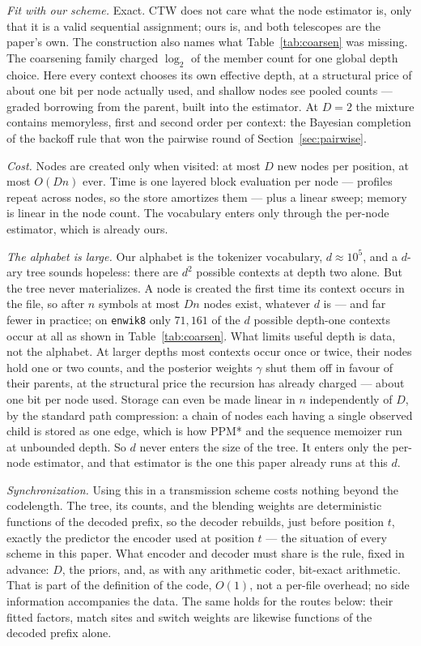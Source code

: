 \documentclass[11pt]{article}
\begin{document}
\emph{Fit with our scheme.}  Exact.  CTW does not care what the node
estimator is, only that it is a valid sequential assignment; ours is,
and both telescopes are the paper's own.  The construction also names
what Table~\ref{tab:coarsen} was missing.  The coarsening family
charged $\log_2$ of the member count for one global depth choice.
Here every context chooses its own effective depth, at a structural
price of about one bit per node actually used, and shallow nodes see
pooled counts --- graded borrowing from the parent, built into the
estimator.  At $D=2$ the mixture contains memoryless, first and
second order per context: the Bayesian completion of the backoff rule
that won the pairwise round of Section~\ref{sec:pairwise}.

\emph{Cost.}  Nodes are created only when visited: at most $D$ new
nodes per position, at most $O(Dn)$ ever.  Time is one layered block
evaluation per node --- profiles repeat across nodes, so the store
amortizes them --- plus a linear sweep; memory is linear in the node
count.  The vocabulary enters only through the per-node estimator,
which is already ours.

\emph{The alphabet is large.}  Our alphabet is the tokenizer
vocabulary, $d \approx 10^5$, and a $d$-ary tree sounds hopeless:
there are $d^2$ possible contexts at depth two alone.  But the tree
never materializes.  A node is created the first time its context
occurs in the file, so after $n$ symbols at most $Dn$ nodes exist,
whatever $d$ is --- and far fewer in practice; on \texttt{enwik8}
only $71{,}161$ of the $d$ possible depth-one contexts occur at all
as shown in Table~\ref{tab:coarsen}.  What limits useful depth is data, not
the alphabet.  At larger depths most contexts occur once or twice,
their nodes hold one or two counts, and the posterior weights
$\gamma$ shut them off in favour of their parents, at the structural
price the recursion has already charged --- about one bit per node
used.  Storage can even be made linear in $n$ independently of $D$,
by the standard path compression: a chain of nodes each having a
single observed child is stored as one edge, which is how PPM* and
the sequence memoizer run at unbounded depth.  So $d$ never enters
the size of the tree.  It enters only the per-node estimator, and
that estimator is the one this paper already runs at this $d$.

\emph{Synchronization.}  Using this in a transmission scheme costs
nothing beyond the codelength.  The tree, its counts, and the
blending weights are deterministic functions of the decoded prefix,
so the decoder rebuilds, just before position $t$, exactly the
predictor the encoder used at position $t$ --- the situation of every
scheme in this paper.  What encoder and decoder must share is the
rule, fixed in advance: $D$, the priors, and, as with any arithmetic
coder, bit-exact arithmetic.  That is part of the definition of the
code, $O(1)$, not a per-file overhead; no side information
accompanies the data.  The same holds for the routes below: their
fitted factors, match sites and switch weights are likewise functions
of the decoded prefix alone.
\end{document}
